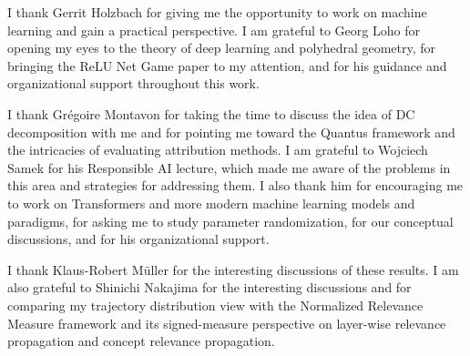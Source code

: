 I thank Gerrit Holzbach for giving me the opportunity to work on machine learning
and gain a practical perspective. I am grateful to Georg Loho for opening my eyes to the theory of deep learning
and polyhedral geometry, for bringing the ReLU Net Game paper to my attention,
and for his guidance and organizational support throughout this work.

I thank Grégoire Montavon for taking the time to discuss the idea of DC
decomposition with me and for pointing me toward the Quantus framework and the
intricacies of evaluating attribution methods. I am grateful to Wojciech Samek
for his Responsible AI lecture, which made me aware of the problems in this area
and strategies for addressing them. I also thank him for encouraging me to work
on Transformers and more modern machine learning models and paradigms, for asking
me to study parameter randomization, for our conceptual discussions, and for his
organizational support.

I thank Klaus-Robert Müller for the interesting discussions of these results.
I am also grateful to Shinichi Nakajima for the interesting discussions and for
comparing my trajectory distribution view with the Normalized Relevance Measure
framework and its signed-measure perspective on layer-wise relevance propagation
and concept relevance propagation.
